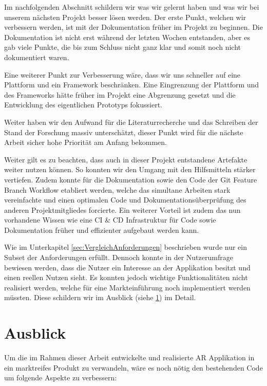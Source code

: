 \documentclass[a4paper]{scrreprt}
\begin{document}
Im nachfolgenden Abschnitt schildern wir was wir gelernt haben und was wir bei unserem nächsten Projekt besser lösen werden.
Der erste Punkt, welchen wir verbessern werden, ist mit der Dokumentation früher im Projekt zu beginnen.  Die Dokumentation ist nicht erst während der letzten Wochen entstanden, aber es gab viele Punkte, die bis zum Schluss nicht ganz klar und somit noch nicht dokumentiert waren.

Eine weiterer Punkt zur Verbesserung wäre, dass wir uns schneller auf eine Plattform und ein Framework beschränken. Eine Eingrenzung der Plattform und des Frameworks hätte früher im Projekt eine Abgrenzung gesetzt und die Entwicklung des eigentlichen Prototyps fokussiert.

Weiter haben wir den Aufwand für die Literaturrecherche und das Schreiben der Stand der Forschung massiv unterschätzt, dieser Punkt wird für die nächste Arbeit sicher hohe Priorität am Anfang bekommen.

Weiter gilt es zu beachten, dass auch in dieser Projekt entstandene Artefakte weiter nutzen können. So konnten wir den Umgang mit den Hilfsmitteln stärker vertiefen. Zudem konnte für die Dokumentation sowie den Code der Git Feature Branch Workflow etabliert werden, welche das simultane Arbeiten stark vereinfachte und einen optimalen Code und Dokumentationsüberprüfung des anderen Projektmitgliedes forcierte. Ein weiterer Vorteil ist zudem das nun vorhandene Wissen wie eine CI \& CD Infrastruktur für Code sowie Dokumentation früher und effizienter aufgebaut werden kann.

Wie im Unterkapitel \ref{sec:VergleichAnforderungen} beschrieben wurde nur ein Subset der Anforderungen erfüllt. Dennoch konnte in der Nutzerumfrage bewiesen werden, dass die Nutzer ein Interesse an der Applikation besitzt und einen reellen Nutzen sieht. Es konnten jedoch wichtige Funktionalitäten nicht realisiert werden, welche für eine Markteinführung noch implementiert werden müssten. Diese schildern wir im Ausblick (siehe \ref{sec:Ausblick}) im Detail.

\section{Ausblick}
\label{sec:Ausblick}
Um die im Rahmen dieser Arbeit entwickelte und realisierte AR Applikation in ein marktreifes Produkt zu verwandeln, wäre es noch nötig den bestehenden Code um folgende Aspekte zu verbessern:
\end{document}
